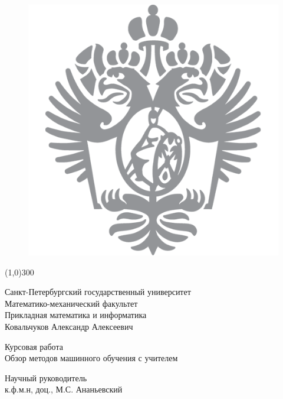 \documentclass{article}
\begin{document}
    
    \begin{figure}
        \centering
        \includegraphics[scale=0.1]{logo.png}
    \end{figure}
    
    \begin{center}
        \begin{center}
            \line(1,0){300}
        \end{center}
    \hfill \break
    \large{Санкт-Петербургский государственный университет}\\ 
    \hfill \break
    \large{Математико-механический факультет}\\
     \hfill \break
   \normalsize{}{Прикладная математика и информатика}\\
    \hfill\break
    \hfill \break
    \large{Ковальчуков Александр Алексеевич}\\
    \hfill \break
    \hfill \break
    
    \hfill \break
    \hfill \break
    \hfill \break
    \large{Курсовая работа\\}
    \hfill \break
    \large{Обзор методов машинного обучения с учителем}\\
    \hfill \break
    \hfill \break
    \hfill \break
    \end{center}
     
     
     \begin{flushright}
        \normalsize{ 
            Научный руководитель \\
            к.ф.м.н,  доц.,  М.С. Ананьевский \\
            
        }
    \end{flushright}
    
\end{document}
